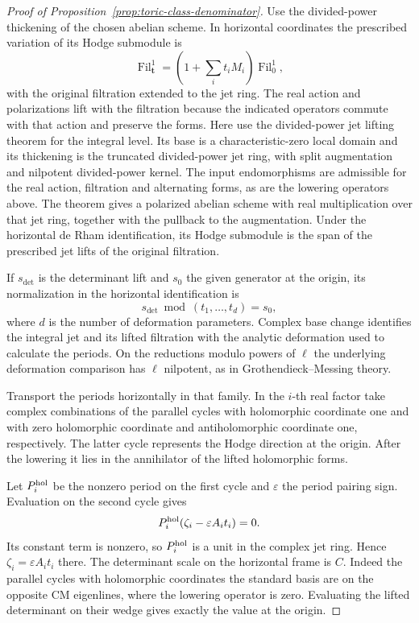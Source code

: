 \begin{proof}[Proof of Proposition~\ref{prop:toric-class-denominator}]
Use the divided-power thickening of the chosen abelian scheme. In horizontal coordinates the prescribed variation of its Hodge submodule is
\[
 \operatorname{Fil}^1_{\boldsymbol t}=(1+\sum_i t_iM_i)\operatorname{Fil}^1_{0},
\]
with the original filtration extended to the jet ring.
The real action and polarizations lift with the
filtration because the indicated operators commute
with that action and preserve the forms.
Here use the divided-power jet lifting theorem for the integral level.
Its base is a characteristic-zero local domain and its
thickening is the truncated divided-power jet ring,
with split augmentation and nilpotent divided-power
kernel. The input endomorphisms are admissible for the
real action, filtration and alternating forms, as are the
lowering operators above. The theorem gives a polarized
abelian scheme with real multiplication over that jet
ring, together with the pullback to the augmentation.
Under the horizontal de Rham identification, its
Hodge submodule is the span of the prescribed jet lifts
of the original filtration.

If \(s_{\det}\) is the determinant lift and \(s_0\) the given generator at the origin, its normalization in the horizontal identification is
\[
 s_{\det}\bmod(t_1,\ldots,t_d)=s_0,
\]
where \(d\) is the number of deformation parameters.
Complex base change identifies the integral jet and its lifted filtration with the analytic deformation used to calculate the periods.
On the reductions modulo powers of \(\ell\) the
underlying deformation comparison has \(\ell\) nilpotent,
as in Grothendieck--Messing theory.
\cite{messing}\label{cor:toric-twist-2}

Transport the periods horizontally in that family.
In the \(i\)-th real factor take complex combinations
of the parallel cycles with holomorphic coordinate one
and with zero holomorphic coordinate and antiholomorphic
coordinate one, respectively. The latter cycle
represents the Hodge direction at the origin.
After the lowering it lies in the annihilator of
the lifted holomorphic forms.

Let \(P_i^{\rm hol}\) be the nonzero period on the first cycle and \(\varepsilon\) the period pairing sign. Evaluation on the second cycle gives
\[
          P_i^{\rm hol}(\zeta_i-\varepsilon A_i t_i)=0 .
\]
Its constant term is nonzero, so \(P_i^{\rm hol}\) is a unit
in the complex jet ring. Hence \(\zeta_i=\varepsilon A_i t_i\) there.
The determinant scale on the horizontal frame is
\(C\). Indeed the parallel cycles with holomorphic
coordinates the standard basis are on the opposite
CM eigenlines, where the lowering operator is zero.
Evaluating the lifted determinant on their wedge
gives exactly the value at the origin.


\end{proof}

